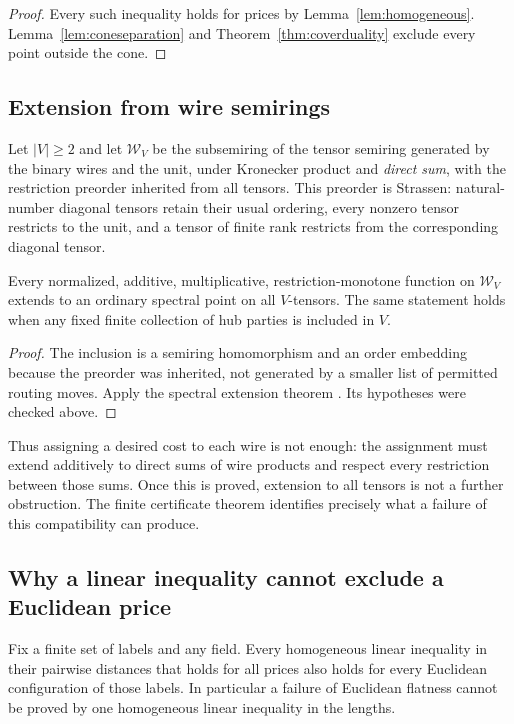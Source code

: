 \begin{proof}
Every such inequality holds for prices by
Lemma~\ref{lem:homogeneous}. Lemma~\ref{lem:coneseparation} and
Theorem~\ref{thm:coverduality} exclude every point outside the cone.
\end{proof}

\subsection{Extension from wire semirings}

Let $|V|\ge2$ and let $\mathcal W_V$ be the subsemiring of the tensor semiring
generated by the binary wires and the unit, under Kronecker
product and \emph{direct sum}, with the restriction preorder
inherited from all tensors. This preorder is Strassen:
natural-number diagonal tensors retain their usual ordering,
every nonzero tensor restricts to the unit, and a tensor of finite
rank restricts from the corresponding diagonal tensor.

\begin{proposition}\label{prop:wiresubsemiring}
Every normalized, additive, multiplicative,
restriction-monotone function on $\mathcal W_V$ extends to an
ordinary spectral point on all $V$-tensors.
The same statement holds when any fixed finite collection of
hub parties is included in $V$.
\end{proposition}

\begin{proof}
The inclusion is a semiring homomorphism and an order embedding
because the preorder was inherited, not generated by a smaller
list of permitted routing moves. Apply the spectral extension
theorem \cite[Theorem 4.16, pp.~53, 56--57 of the author
version]{wz-spectra}. Its hypotheses were checked above.
\end{proof}

Thus assigning a desired cost to each wire is not enough: the
assignment must extend additively to direct sums of wire products
and respect every restriction between those sums.
Once this is proved, extension to all tensors is not a further
obstruction. The finite certificate theorem identifies precisely
what a failure of this compatibility can produce.

\subsection{Why a linear inequality cannot exclude a Euclidean price}

\begin{proposition}
\label{prop:no-linear-euclidean-obstruction}
Fix a finite set of labels and any field. Every homogeneous linear
inequality in their pairwise distances that holds for all prices
also holds for every Euclidean configuration of those labels.
In particular a failure of Euclidean flatness cannot be proved by
one homogeneous linear inequality in the lengths.
\end{proposition}

